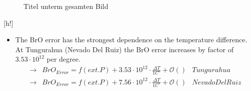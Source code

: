 \documentclass  [
  paper    = a4,
  BCOR     = 10mm,
  twoside,
  fontsize = 12pt,
  fleqn,
  toc      = bibnumbered,
  toc      = listofnumbered,
  numbers  = noendperiod,
  headings = normal,
  listof   = leveldown,
  version  = 3.03
]                                       {scrreprt}
\begin{document}
	\begin{figure}[h!]			
		\caption{Titel unterm gesamten Bild}
		\label{fig:difftemp}
	\end{figure}[h!]
	\begin{itemize}
		\item The BrO error has the strongest dependence on the temperature difference. At Tungurahua (Nevado Del Ruiz) the BrO error increases by factor of $3.53\cdot10^{12}$  per degree.
		\begin{align*}
		\rightarrow&  BrO_{Error} = f(ext. P)+ 3.53\cdot10^{12}\cdot\frac{\Delta T}{1C^{\circ}} + \mathcal{O}\left(\right) & Tungurahua\\
		\rightarrow&  BrO_{Error} = f(ext. P)+7.56\cdot10^{12}\cdot\frac{\Delta T}{1C^{\circ}} + \mathcal{O}\left(\right) & Nevado Del Ruiz\\
		\end{align*}
	\end{itemize}
\end{document}
